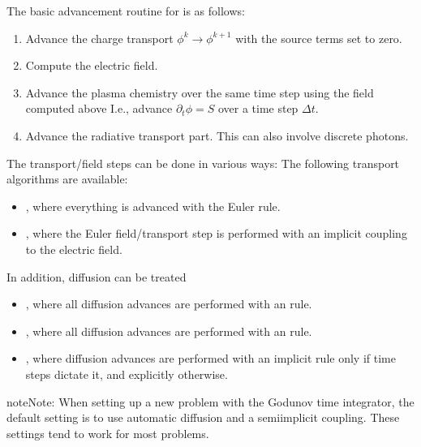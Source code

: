 \documentclass[letterpaper,10pt,english]{sphinxmanual}
\begin{document}
The basic advancement routine for  is as follows:
\begin{enumerate}
%
\item {} 
Advance the charge transport \(\phi^k \rightarrow \phi^{k+1}\) with the source terms set to zero.

\item {} 
Compute the electric field.

\item {} 
Advance the plasma chemistry over the same time step using the field computed above
I.e., advance \(\partial_t\phi = S\) over a time step \(\Delta t\).

\item {} 
Advance the radiative transport part.
This can also involve discrete photons.

\end{enumerate}

The transport/field steps can be done in various ways:
The following transport algorithms are available:
\begin{itemize}
\item {} 
, where everything is advanced with the Euler rule.

\item {} 
, where the Euler field/transport step is performed with an implicit coupling to the electric field.

\end{itemize}

In addition, diffusion can be treated
\begin{itemize}
\item {} 
, where all diffusion advances are performed with an  rule.

\item {} 
, where all diffusion advances are performed with an  rule.

\item {} 
, where diffusion advances are performed with an implicit rule only if time steps dictate it, and explicitly otherwise.

\end{itemize}

\begin{sphinxadmonition}{note}{Note:}
When setting up a new problem with the Godunov time integrator, the default setting is to use automatic diffusion and a semi\sphinxhyphen{}implicit coupling.
These settings tend to work for most problems.
\end{sphinxadmonition}
\end{document}
